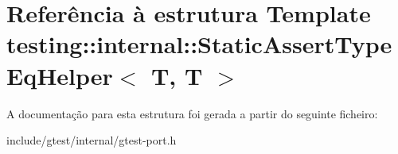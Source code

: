 \hypertarget{structtesting_1_1internal_1_1StaticAssertTypeEqHelper_3_01T_00_01T_01_4}{\section{Referência à estrutura Template testing\-:\-:internal\-:\-:Static\-Assert\-Type\-Eq\-Helper$<$ T, T $>$}
\label{structtesting_1_1internal_1_1StaticAssertTypeEqHelper_3_01T_00_01T_01_4}
}


A documentação para esta estrutura foi gerada a partir do seguinte ficheiro\-:\begin{DoxyCompactItemize}
\item 
include/gtest/internal/gtest-\/port.\-h\end{DoxyCompactItemize}
